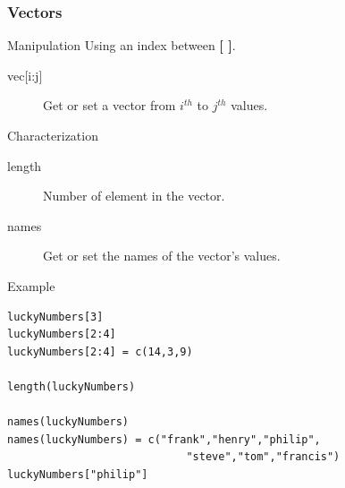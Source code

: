 \documentclass[10pt]{beamer}
\newenvironment{xframe}[2][]
  {\begin{frame}[fragile,environment=xframe,#1]
  \frametitle{#2}}
  {\end{frame}}
\begin{document}

\begin{xframe}[shrink=5]{Vectors}
  \begin{block}{Manipulation}
    Using an index between {\bf [ ]}.
    \begin{description}
    \item[{vec[i:j]} ]Get or set a vector from $i^{th}$ to $j^{th}$ values.
    \end{description}
  \end{block}
  \begin{block}{Characterization}
    \begin{description}
    \item[length] Number of element in the vector.
    \item[names] Get or set the names of the vector's values.
    \end{description}
  \end{block}
  \begin{exampleblock}{Example}
\begin{verbatim}
luckyNumbers[3]
luckyNumbers[2:4]
luckyNumbers[2:4] = c(14,3,9)

length(luckyNumbers)

names(luckyNumbers)
names(luckyNumbers) = c("frank","henry","philip",
                            "steve","tom","francis") 
luckyNumbers["philip"]
\end{verbatim}
  \end{exampleblock}
\end{xframe}

\end{document}
